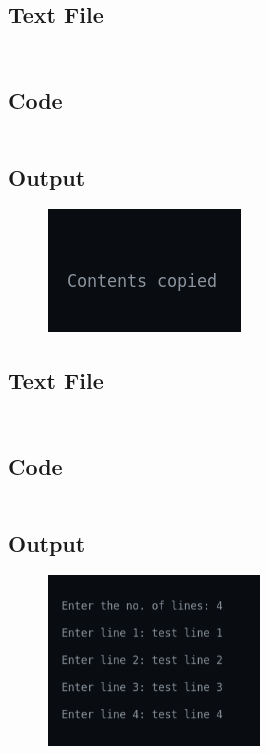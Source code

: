 \documentclass[12pt]{article}
\begin{document}
\subsection{Text File}
\inputminted{c}{q1.txt}

\newpage
\section{}
\subsection{Code}
\inputminted{c}{q2.c}
\subsection{Output}
\begin{figure}[h]
    \centering
    \includegraphics{2.png}
\end{figure}
\subsection{Text File}
\inputminted{c}{q2.txt}

\newpage
\section{}
\subsection{Code}
\inputminted{c}{q3.c}
\subsection{Output}
\begin{figure}[h]
    \centering
    \includegraphics[width=0.5\textwidth]{3.png}
\end{figure}
\end{document}
